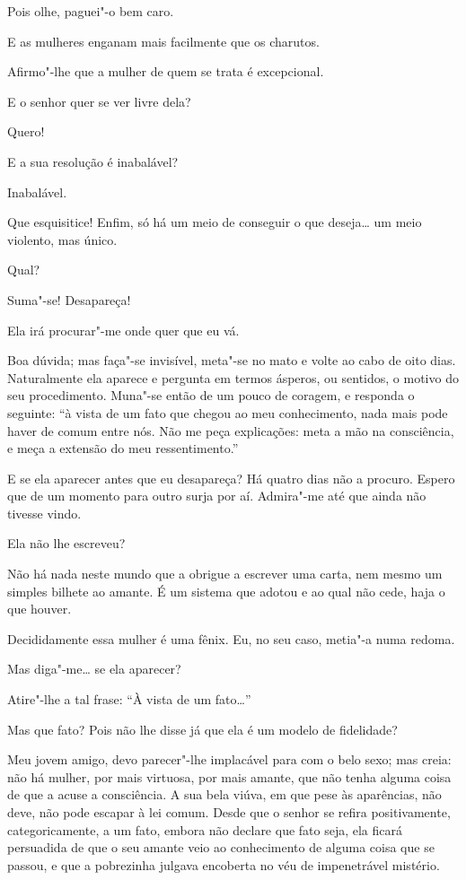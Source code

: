    Pois olhe, paguei"-o
bem caro.

  E as mulheres enganam mais facilmente que os
charutos.

  Afirmo"-lhe que a mulher de quem se trata é
excepcional.

  E o senhor quer se ver livre dela?

  Quero!

  E a sua resolução é inabalável? 

  Inabalável.

  Que esquisitice! Enfim, só há um meio de conseguir o que
deseja\ldots{} um meio violento, mas único.

  Qual?

  Suma"-se! Desapareça!

  Ela irá procurar"-me onde quer que eu vá.

  Boa dúvida; mas faça"-se invisível, meta"-se no mato e volte
ao cabo de oito dias. Naturalmente ela aparece e pergunta em termos
ásperos, ou sentidos, o motivo do seu procedimento. Muna"-se então de um
pouco de coragem, e responda o seguinte: ``à vista de um
fato que chegou ao meu conhecimento, nada mais pode haver de comum
entre nós. Não me peça explicações: meta a mão na consciência, e meça a
extensão do meu ressentimento.''

  E se ela aparecer antes que eu desapareça? Há
quatro dias não a procuro. Espero que de um momento para outro surja
por aí. Admira"-me até que ainda não tivesse vindo.

  Ela não lhe escreveu?

  Não há nada neste mundo que a obrigue a
escrever uma carta, nem mesmo um simples bilhete ao amante. É um
sistema que adotou e ao qual não cede, haja o que houver.

 Decididamente essa mulher é uma fênix. Eu,
no seu caso, metia"-a numa redoma.

  Mas diga"-me\ldots{} se ela aparecer?

  Atire"-lhe a tal frase: ``À
vista de um fato\ldots{}''

   Mas que fato?
Pois não lhe disse já que ela é um modelo de fidelidade?

  Meu jovem
amigo, devo parecer"-lhe implacável para com o belo sexo; mas creia: não
há mulher, por mais virtuosa, por mais amante, que não tenha alguma
coisa de que a acuse a consciência. A sua bela viúva, em que pese às
aparências, não deve, não pode escapar à lei comum. Desde que o senhor
se refira positivamente, categoricamente, a um fato, embora não declare
que fato seja, ela ficará persuadida de que o seu amante veio ao
conhecimento de alguma coisa que se passou, e que a pobrezinha julgava
encoberta no véu de impenetrável mistério.

